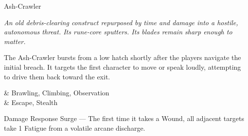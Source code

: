 \begin{NPC}[%
    name=Ash-Crawler,%
    description=Bronze-Cast Ruin Sweeper%
  ]{Ash-Crawler}
  
    \emph{An old debris-clearing construct repurposed by time and damage into a hostile, autonomous threat. Its rune-core sputters. Its blades remain sharp enough to matter.}
  
    The Ash-Crawler bursts from a low hatch shortly after the players navigate the initial breach. It targets the first character to move or speak loudly, attempting to drive them back toward the exit.

    \vspace{0.5\baselineskip}
    \begin{SkillsBox}
        \Skilled & Brawling, Climbing, Observation \\
        \Novice & Escape, Stealth \\
      \end{SkillsBox}

    \begin{TraitsBox}
      \item[Damage Response Surge] — The first time it takes a Wound, all adjacent targets take 1 Fatigue from a volatile arcane discharge.
    \end{TraitsBox}
  
    \DamageBox[totalfatigue=2,totalmild=2,totalmoderate=0,totalsevere=0]%

\end{NPC}